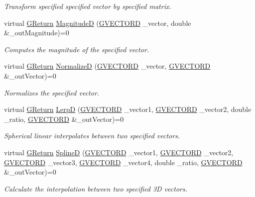 \begin{DoxyCompactItemize}
\begin{DoxyCompactList}\small\item\em Transform specified specified vector by specified matrix. \end{DoxyCompactList}\item 
virtual \mbox{\hyperlink{namespaceGW_a67a839e3df7ea8a5c5686613a7a3de21}{G\+Return}} \mbox{\hyperlink{classGW_1_1MATH_1_1GVector_aa818487d161f4d66a27b3e1948623bdc}{MagnitudeD}} (\mbox{\hyperlink{structGW_1_1MATH_1_1GVECTORD}{G\+V\+E\+C\+T\+O\+RD}} \+\_\+vector, double \&\+\_\+out\+Magnitude)=0
\begin{DoxyCompactList}\small\item\em Computes the magnitude of the specified vector. \end{DoxyCompactList}\item 
virtual \mbox{\hyperlink{namespaceGW_a67a839e3df7ea8a5c5686613a7a3de21}{G\+Return}} \mbox{\hyperlink{classGW_1_1MATH_1_1GVector_a0f950e0db160053011d6aa0b5cf3159d}{NormalizeD}} (\mbox{\hyperlink{structGW_1_1MATH_1_1GVECTORD}{G\+V\+E\+C\+T\+O\+RD}} \+\_\+vector, \mbox{\hyperlink{structGW_1_1MATH_1_1GVECTORD}{G\+V\+E\+C\+T\+O\+RD}} \&\+\_\+out\+Vector)=0
\begin{DoxyCompactList}\small\item\em Normalizes the specified vector. \end{DoxyCompactList}\item 
virtual \mbox{\hyperlink{namespaceGW_a67a839e3df7ea8a5c5686613a7a3de21}{G\+Return}} \mbox{\hyperlink{classGW_1_1MATH_1_1GVector_ad5014f18d3986d46a6a7fd4828e5040e}{LerpD}} (\mbox{\hyperlink{structGW_1_1MATH_1_1GVECTORD}{G\+V\+E\+C\+T\+O\+RD}} \+\_\+vector1, \mbox{\hyperlink{structGW_1_1MATH_1_1GVECTORD}{G\+V\+E\+C\+T\+O\+RD}} \+\_\+vector2, double \+\_\+ratio, \mbox{\hyperlink{structGW_1_1MATH_1_1GVECTORD}{G\+V\+E\+C\+T\+O\+RD}} \&\+\_\+out\+Vector)=0
\begin{DoxyCompactList}\small\item\em Spherical linear interpolates between two specified vectors. \end{DoxyCompactList}\item 
virtual \mbox{\hyperlink{namespaceGW_a67a839e3df7ea8a5c5686613a7a3de21}{G\+Return}} \mbox{\hyperlink{classGW_1_1MATH_1_1GVector_ac585c33ea16033decc9de649d917ee8d}{SplineD}} (\mbox{\hyperlink{structGW_1_1MATH_1_1GVECTORD}{G\+V\+E\+C\+T\+O\+RD}} \+\_\+vector1, \mbox{\hyperlink{structGW_1_1MATH_1_1GVECTORD}{G\+V\+E\+C\+T\+O\+RD}} \+\_\+vector2, \mbox{\hyperlink{structGW_1_1MATH_1_1GVECTORD}{G\+V\+E\+C\+T\+O\+RD}} \+\_\+vector3, \mbox{\hyperlink{structGW_1_1MATH_1_1GVECTORD}{G\+V\+E\+C\+T\+O\+RD}} \+\_\+vector4, double \+\_\+ratio, \mbox{\hyperlink{structGW_1_1MATH_1_1GVECTORD}{G\+V\+E\+C\+T\+O\+RD}} \&\+\_\+out\+Vector)=0
\begin{DoxyCompactList}\small\item\em Calculate the interpolation between two specified 3D vectors. \end{DoxyCompactList}\end{DoxyCompactItemize}



